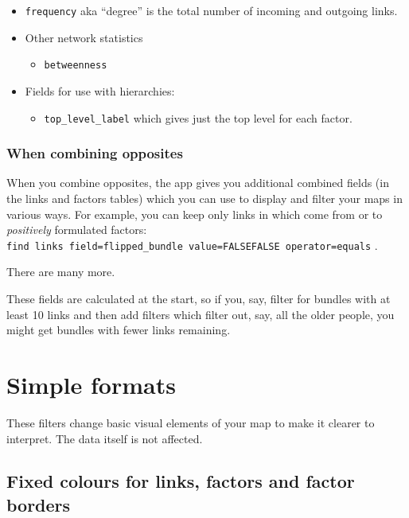 \documentclass[
]{book}
\providecommand{\tightlist}{%
  \setlength{\itemsep}{0pt}\setlength{\parskip}{0pt}}
\begin{document}
\begin{itemize}
\tightlist
\item
  \texttt{frequency} aka ``degree'' is the total number of incoming and outgoing links.
\item
  Other network statistics

  \begin{itemize}
  \tightlist
  \item
    \texttt{betweenness}
  \end{itemize}
\item
  Fields for use with hierarchies:

  \begin{itemize}
  \tightlist
  \item
    \texttt{top\_level\_label} which gives just the top level for each factor.
  \end{itemize}
\end{itemize}

\hypertarget{when-combining-opposites}{%
\subsection{When combining opposites}\label{when-combining-opposites}}

When you combine opposites, the app gives you additional combined fields (in the links and factors tables) which you can use to display and filter your maps in various ways. For example, you can keep only links in which come from or to \emph{positively} formulated factors: \texttt{find\ links\ field=flipped\_bundle\ value=FALSE\textbar{}FALSE\ operator=equals} .

There are many more.

These fields are calculated at the start, so if you, say, filter for bundles with at least 10 links and then add filters which filter out, say, all the older people, you might get bundles with fewer links remaining.

\hypertarget{xsimple-formats}{%
\chapter{Simple formats}\label{xsimple-formats}}

These filters change basic visual elements of your map to make it clearer to interpret. The data itself is not affected.

\hypertarget{fixed-colours-for-links-factors-and-factor-borders}{%
\section{Fixed colours for links, factors and factor borders}\label{fixed-colours-for-links-factors-and-factor-borders}}
\end{document}
